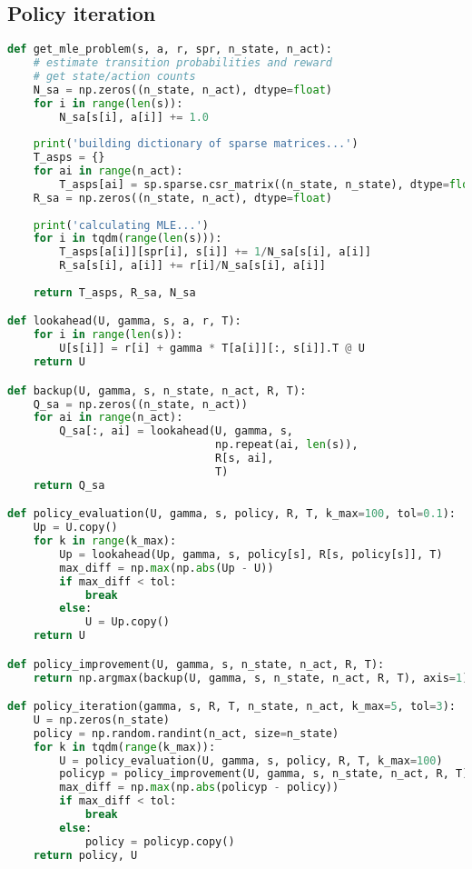 \documentclass[twoside,11pt]{article}
\begin{document}
\subsection{Policy iteration}
\begin{algorithm}
\begin{lstlisting}[language=Python]
def get_mle_problem(s, a, r, spr, n_state, n_act):
    # estimate transition probabilities and reward
    # get state/action counts
    N_sa = np.zeros((n_state, n_act), dtype=float)
    for i in range(len(s)):
        N_sa[s[i], a[i]] += 1.0
    
    print('building dictionary of sparse matrices...')
    T_asps = {}
    for ai in range(n_act):
        T_asps[ai] = sp.sparse.csr_matrix((n_state, n_state), dtype=float)
    R_sa = np.zeros((n_state, n_act), dtype=float)
    
    print('calculating MLE...')
    for i in tqdm(range(len(s))):
        T_asps[a[i]][spr[i], s[i]] += 1/N_sa[s[i], a[i]]
        R_sa[s[i], a[i]] += r[i]/N_sa[s[i], a[i]]
    
    return T_asps, R_sa, N_sa

def lookahead(U, gamma, s, a, r, T):
    for i in range(len(s)):
        U[s[i]] = r[i] + gamma * T[a[i]][:, s[i]].T @ U
    return U

def backup(U, gamma, s, n_state, n_act, R, T):
    Q_sa = np.zeros((n_state, n_act))
    for ai in range(n_act):
        Q_sa[:, ai] = lookahead(U, gamma, s, 
                                np.repeat(ai, len(s)), 
                                R[s, ai],
                                T)
    return Q_sa

def policy_evaluation(U, gamma, s, policy, R, T, k_max=100, tol=0.1):
    Up = U.copy()
    for k in range(k_max):
        Up = lookahead(Up, gamma, s, policy[s], R[s, policy[s]], T)
        max_diff = np.max(np.abs(Up - U))
        if max_diff < tol:
            break
        else:
            U = Up.copy()
    return U

def policy_improvement(U, gamma, s, n_state, n_act, R, T):
    return np.argmax(backup(U, gamma, s, n_state, n_act, R, T), axis=1)

def policy_iteration(gamma, s, R, T, n_state, n_act, k_max=5, tol=3):
    U = np.zeros(n_state)
    policy = np.random.randint(n_act, size=n_state)
    for k in tqdm(range(k_max)):
        U = policy_evaluation(U, gamma, s, policy, R, T, k_max=100)
        policyp = policy_improvement(U, gamma, s, n_state, n_act, R, T)
        max_diff = np.max(np.abs(policyp - policy))
        if max_diff < tol:
            break
        else:
            policy = policyp.copy()
    return policy, U
\end{lstlisting}
\end{algorithm}
\end{document}
